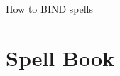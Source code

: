 \documentclass[a4paper,openany]{book}
\begin{document}

%
	{How to BIND spells}%
	{}

\frontmatter

\tableofcontents

\mainmatter

\chapter{Spell Book}
\end{document}
